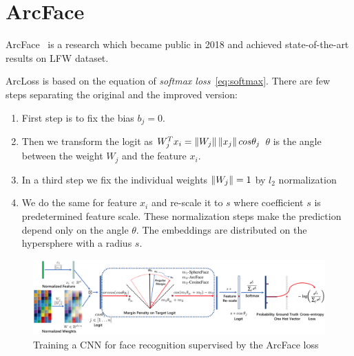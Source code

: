 \chapter{ArcFace}\label{ch:arcface}
ArcFace~\cite{ArcFace} is a research which became public in 2018 and achieved state-of-the-art results on LFW dataset.

ArcLoss is based on the equation of \textit{softmax loss}~\ref{eq:softmax}.
There are few steps separating the original and the improved version:
\begin{enumerate}
    \item First step is to fix the bias $b_j = 0$.
    \item Then we transform the logit as $W_j^T x_i = \left\lVert W_j\right\rVert \left\lVert x_j\right\rVert cos \theta_j$
    $\theta$ is the angle between the weight $W_j$ and the feature $x_i$.
    \item In a third step we fix the individual weights $\left\lVert W_j\right\rVert = 1$ by $l_2$ normalization
    \item We do the same for feature $x_i$ and re-scale it to $s$ where coefficient $s$ is predetermined feature scale.
    These normalization steps make the prediction depend only on the angle $\theta$.
    The embeddings are distributed on the hypersphere with a radius $s$.
\end{enumerate}

\begin{figure}[H]
    \centering
    \includegraphics[width=\columnwidth]{images/arcface/arcface.png}
    \caption{Training a CNN for face recognition supervised by the ArcFace loss~\cite{ArcFace}}
    \label{fig:arcface}
\end{figure}